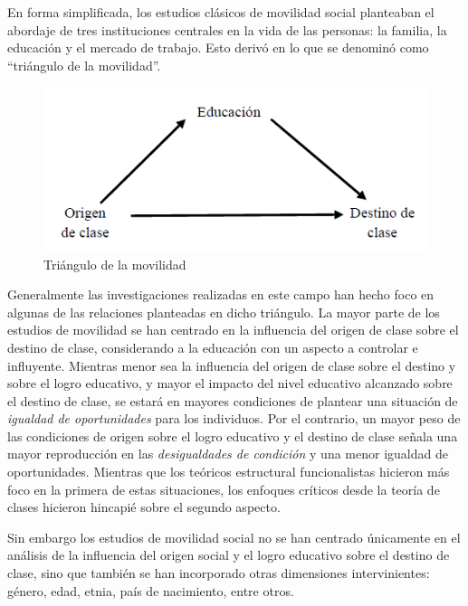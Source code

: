 \documentclass[
]{book}
\begin{document}
En forma simplificada, los estudios clásicos de movilidad social planteaban el abordaje de tres instituciones centrales en la vida de las personas: la familia, la educación y el mercado de trabajo. Esto derivó en lo que se denominó como ``triángulo de la movilidad''.

\begin{figure}

{\centering \includegraphics[width=0.8\linewidth]{imagenes/triangulo} 

}

\caption{Triángulo de la movilidad }\label{fig:unnamed-chunk-90}
\end{figure}

Generalmente las investigaciones realizadas en este campo han hecho foco en algunas de las relaciones planteadas en dicho triángulo. La mayor parte de los estudios de movilidad se han centrado en la influencia del origen de clase sobre el destino de clase, considerando a la educación con un aspecto a controlar e influyente. Mientras menor sea la influencia del origen de clase sobre el destino y sobre el logro educativo, y mayor el impacto del nivel educativo alcanzado sobre el destino de clase, se estará en mayores condiciones de plantear una situación de \emph{igualdad de oportunidades} para los individuos. Por el contrario, un mayor peso de las condiciones de origen sobre el logro educativo y el destino de clase señala una mayor reproducción en las \emph{desigualdades de condición} y una menor igualdad de oportunidades. Mientras que los teóricos estructural funcionalistas hicieron más foco en la primera de estas situaciones, los enfoques críticos desde la teoría de clases hicieron hincapié sobre el segundo aspecto.

Sin embargo los estudios de movilidad social no se han centrado únicamente en el análisis de la influencia del origen social y el logro educativo sobre el destino de clase, sino que también se han incorporado otras dimensiones intervinientes: género, edad, etnia, país de nacimiento, entre otros.
\end{document}
